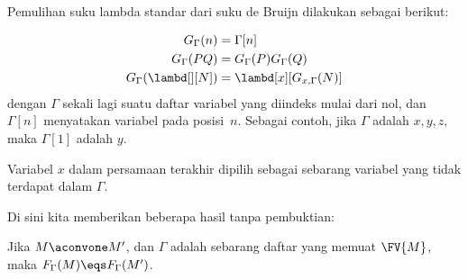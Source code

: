 \documentclass[../../../include/open-logic-section]{subfiles}
\begin{document}
Pemulihan suku lambda standar dari suku de Bruijn dilakukan sebagai berikut:

\begin{defn}
  \begin{align*}
    G_\Gamma(n) &= \Gamma[n] \\
    G_\Gamma(PQ) &= G_\Gamma(P) G_\Gamma(Q) \\
    G_\Gamma(\lambd[][N]) &= \lambd[x][G_{x,\Gamma}(N)]
  \end{align*}
  dengan $\Gamma$ sekali lagi suatu daftar variabel yang diindeks mulai dari
  nol, dan $\Gamma[n]$ menyatakan variabel pada posisi~$n$. Sebagai contoh,
  jika $\Gamma$ adalah $x,y,z$, maka $\Gamma[1]$ adalah $y$.

  Variabel $x$ dalam persamaan terakhir dipilih sebagai sebarang variabel
  yang tidak terdapat dalam $\Gamma$.
\end{defn}

Di sini kita memberikan beberapa hasil tanpa pembuktian:

\begin{prop}
  Jika $M \aconvone M'$, dan $\Gamma$ adalah sebarang daftar yang memuat
  $\FV{M}$, maka $F_\Gamma(M) \eqs F_\Gamma(M')$.
\end{prop}
\end{document}
